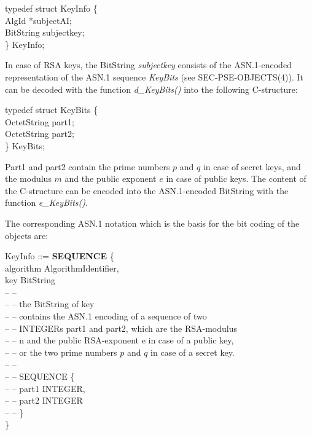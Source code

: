 {\small
\bvtab
\4      typedef struct KeyInfo \{ \\
\6              AlgId \3        *subjectAI; \\
\6              BitString \3    subjectkey; \\
\4      \} KeyInfo;  \\
\evtab
}

In case of RSA keys, the BitString {\em subjectkey} consists of the ASN.1-encoded representation of the
ASN.1 sequence {\em KeyBits} (see SEC-PSE-OBJECTS(4)). 
It can be decoded with the function
{\em d\_KeyBits()} into the following C-structure:

{\small
\bvtab
\4      typedef struct KeyBits \{ \\
\6	        OctetString \4 part1; \\
\6      	OctetString \4 part2; \\
\4      \} KeyBits; \\
\evtab
}

Part1 and part2 contain the prime numbers $p$ and $q$ in case of secret keys, and the 
modulus $m$ and the public exponent $e$ in case of public keys. The content of the
C-structure can be encoded into the ASN.1-encoded BitString with the function
{\em e\_KeyBits()}.

The corresponding ASN.1 notation which is the basis for the bit coding of the objects are:

{\small
\bvtab
\1 KeyInfo ::= \3 {\bf SEQUENCE} \{  \\
\5 algorithm         \2 AlgorithmIdentifier,    \\
\5 key               \2 BitString            \\
\5 -- -- \\
\5 -- -- the BitString of key    \\
\5 -- -- contains the ASN.1 encoding of a sequence of two \\
\5 -- -- INTEGERs part1 and part2, which are the RSA-modulus    \\
\5 -- -- n and the public RSA-exponent e in case of a public key,    \\
\5 -- -- or the two prime numbers $p$ and $q$ in case of a secret key.    \\
\5 -- -- \\
\5 -- -- SEQUENCE \{ \\
\5 -- -- \2       part1 INTEGER,   \\
\5 -- -- \2       part2 INTEGER  \\
\5 -- -- \} \\
\4 \}
\evtab
}

